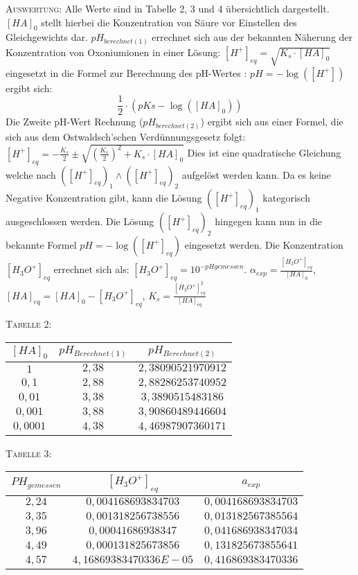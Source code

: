 \documentclass[11pt, a4paper]{article}
\begin{document}
\textsc{Auswertung:}\hspace{8mm} Alle Werte sind in Tabelle 2, 3 und 4 übersichtlich dargestellt. $[HA]_0$ stellt hierbei die Konzentration von Säure vor Einstellen des Gleichgewichts dar. $pH_{berechnet (1)}$ errechnet sich aus der bekannten Näherung der Konzentration von Oxoniumionen in einer Lösung: $[H^+]_{eq}=\sqrt{K_s\cdot [HA]_0}$ eingesetzt in die Formel zur Berechnung des pH-Wertes : $pH=-\log([H^+])$ ergibt sich: $$\frac{1}{2}\cdot (pKs-\log([HA]_0))$$ Die Zweite pH-Wert Rechnung ($pH_{berechnet (2)}$) ergibt sich aus einer Formel, die sich aus dem Ostwaldsch'schen Verdünnungsgesetz folgt: $[H^+]_{eq} = -\frac{K_s}{2}\pm\sqrt{(\frac{K_s}{2})^2+K_s\cdot [HA]_0}$ Dies ist eine quadratische Gleichung welche nach $([H^+]_{eq})_1\wedge ([H^+]_{eq})_2$ aufgelöst werden kann. Da es keine Negative Konzentration gibt, kann die Lösung $([H^+]_{eq})_1$ kategorisch ausgeschlossen werden. Die Lösung $([H^+]_{eq})_2$ hingegen kann nun in die bekannte Formel $pH=-\log([H^+]_{eq})$ eingesetzt werden. Die Konzentration $[H_3O^+]_{eq}$ errechnet sich als: $[H_3O^+]_{eq}=10^{-pH gemessen}$. $\alpha_{exp}=\frac{[H_3O^+]_{eq}}{[HA]_0}$, $[HA]_{eq}=[HA]_0-[H_3O^+]_{eq}$, $K_s=\frac{[H_3O^+]_{eq}^2}{[HA]_{eq}}$\\

\begin{center}
\textsc{Tabelle 2:}\\
\begin{tabular}{ccc}
$[HA]_0$ & $pH_{Berechnet(1)}$ & $pH_{Berechnet(2)}$\\
\hline
$1$ & $2,38$ & $2,38090521970912$\\
$0,1$ & $2,88$ & $2,88286253740952$\\
$0,01$ & $3,38$ & $3,3890515483186$\\
$0,001$ & $3,88$ & $3,90860489446604$\\
$0,0001$ & $4,38$ & $4,46987907360171$\\
\end{tabular}
\end{center}

\begin{center}
\textsc{Tabelle 3:}\\
\begin{tabular}{ccc}
$PH_{gemessen}$ & $[H_3O^+]_{eq}$ & $a_{exp}$\\
\hline
$2,24$ & $0,004168693834703$ & $0,004168693834703$\\
$3,35$ & $0,001318256738556$ & $0,013182567385564$\\
$3,96$ & $0,00041686938347$ & $0,041686938347034$\\
$4,49$ & $0,000131825673856$ & $0,131825673855641$\\
$4,57$ & $4,16869383470336E-05$ & $0,416869383470336$\\
\end{tabular}
\end{center}
\end{document}
